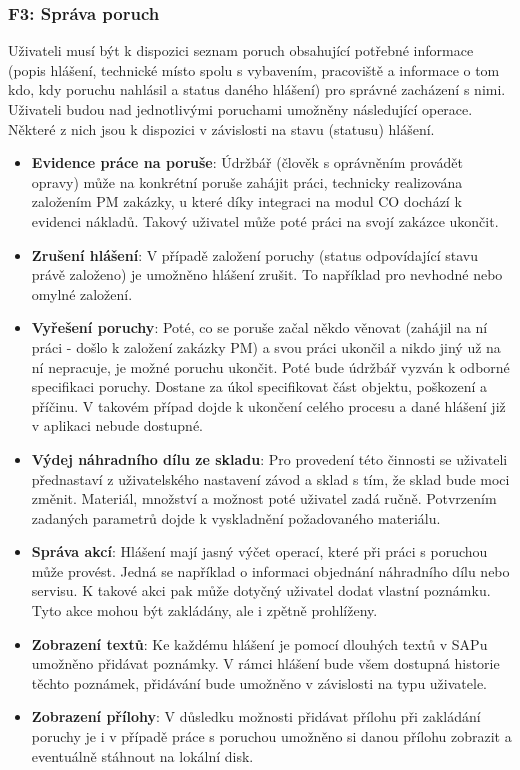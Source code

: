 \documentclass[thesis=M,czech]{FITthesis}[2012/06/26]
\begin{document}
\subsubsection{F3: Správa poruch}
\label{sssec:fc_sprava_poruch}
Uživateli musí být k dispozici seznam poruch obsahující potřebné informace (popis hlášení, technické místo spolu s vybavením, pracoviště a informace o tom kdo, kdy poruchu nahlásil a status daného hlášení) pro správné zacházení s nimi. Uživateli budou nad jednotlivými poruchami umožněny následující operace. Některé z nich jsou k dispozici v závislosti na stavu (statusu) hlášení.
\begin{itemize}
	\item
	\textbf{Evidence práce na poruše}: Údržbář (člověk s oprávněním provádět opravy) může na konkrétní poruše zahájit práci, technicky realizována založením PM zakázky, u které díky integraci na modul CO dochází k evidenci nákladů. Takový uživatel může poté práci na svojí zakázce ukončit.
	\item
	\textbf{Zrušení hlášení}: V případě založení poruchy (status odpovídající stavu právě založeno) je umožněno hlášení zrušit. To například pro nevhodné nebo omylné založení. 
	\item
	\textbf{Vyřešení poruchy}: Poté, co se poruše začal někdo věnovat (zahájil na ní práci - došlo k založení zakázky PM) a svou práci ukončil a nikdo jiný už na ní nepracuje, je možné poruchu ukončit. Poté bude údržbář vyzván k odborné specifikaci poruchy. Dostane za úkol specifikovat část objektu, poškození a příčinu. V takovém případ dojde k ukončení celého procesu a dané hlášení již v aplikaci nebude dostupné.
	\item
	\textbf{Výdej náhradního dílu ze skladu}: Pro provedení této činnosti se uživateli přednastaví z uživatelského nastavení závod a sklad s tím, že sklad bude moci změnit. Materiál, množství a možnost poté uživatel zadá ručně. Potvrzením zadaných parametrů dojde k vyskladnění požadovaného materiálu.
	\item
	\textbf{Správa akcí}: Hlášení mají jasný výčet operací, které při práci s poruchou může provést. Jedná se například o informaci objednání náhradního dílu nebo servisu. K takové akci pak může dotyčný uživatel dodat vlastní poznámku. Tyto akce mohou být zakládány, ale i zpětně prohlíženy.
	\item
	\textbf{Zobrazení textů}: Ke každému hlášení je pomocí dlouhých textů v SAPu umožněno přidávat poznámky. V rámci hlášení bude všem dostupná historie těchto poznámek, přidávání bude umožněno v závislosti na typu uživatele.
	\item
	\textbf{Zobrazení přílohy}: V důsledku možnosti přidávat přílohu při zakládání poruchy je i v případě práce s poruchou umožněno si danou přílohu zobrazit a eventuálně stáhnout na lokální disk.
\end{itemize} 
\end{document}
